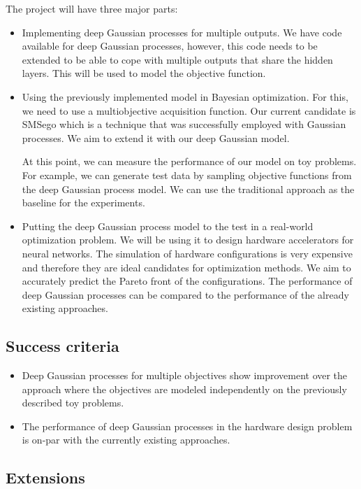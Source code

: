 \documentclass[a4paper, 11pt]{article}
\begin{document}
The project will have three major parts:
\begin{itemize}
\item
Implementing deep Gaussian processes for multiple outputs. We have code available for deep Gaussian processes, however, this code needs to be extended to be able to cope with multiple outputs that share the hidden layers. This will be used to model the objective function. \cite{dgps}
\item
Using the previously implemented model in Bayesian optimization. For this, we need to use a multiobjective acquisition function. Our current candidate is SMSego \cite{smsego} which is a technique that was successfully employed with Gaussian processes. We aim to extend it with our deep Gaussian model.

At this point, we can measure the performance of our model on toy problems. For example, we can generate test data by sampling objective functions from the deep Gaussian process model. We can use the traditional approach as the baseline for the experiments.
\item
Putting the deep Gaussian process model to the test in a real-world optimization problem. We will be using it to design hardware accelerators for neural networks. The simulation of hardware configurations is very expensive and therefore they are  ideal candidates for optimization methods. We aim to accurately predict the Pareto front of the configurations. The performance of deep Gaussian processes can be compared to the performance of the already existing approaches. \cite{hardware} \cite{acc}
\end{itemize}

\subsection*{Success criteria}

\begin{itemize}
\item
Deep Gaussian processes for multiple objectives show improvement over the approach where the objectives are modeled independently on the previously described toy problems.
\item
The performance of deep Gaussian processes in the hardware design problem is on-par with the currently existing approaches.
\end{itemize}

\subsection*{Extensions}
\end{document}
